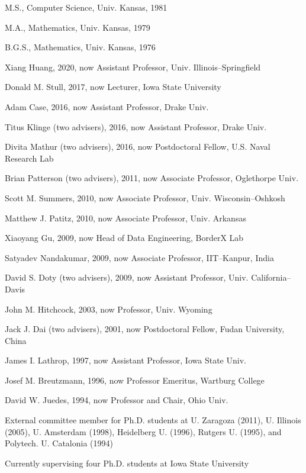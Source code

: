 \documentclass[12pt]{article}
\begin{document}
\indent M.S., Computer Science, Univ. Kansas, 1981

\indent M.A., Mathematics, Univ. Kansas, 1979

\indent B.G.S., Mathematics, Univ. Kansas, 1976


\vspace{0.2cm}


\indent Xiang Huang, 2020, now Assistant Professor, Univ. Illinois--Springfield

\indent Donald M. Stull, 2017, now Lecturer, Iowa State University

\indent Adam Case, 2016, now Assistant Professor, Drake Univ.

\indent Titus Klinge (two advisers), 2016, now Assistant Professor, Drake Univ.

\indent Divita Mathur (two advisers), 2016, now Postdoctoral Fellow, U.S. Naval Research Lab

\indent Brian Patterson (two advisers), 2011, now Associate Professor, Oglethorpe Univ.

\indent Scott M. Summers, 2010, now Associate Professor, Univ. Wisconsin--Oshkosh

\indent Matthew J. Patitz, 2010, now Associate Professor, Univ. Arkansas

\indent Xiaoyang Gu, 2009, now Head of Data Engineering, BorderX Lab

\indent Satyadev Nandakumar, 2009, now Associate Professor, IIT--Kanpur, India

\indent David S. Doty (two advisers), 2009, now Assistant Professor, Univ. California--Davis

\indent John M. Hitchcock, 2003, now Professor, Univ. Wyoming

\indent Jack J. Dai (two advisers), 2001, now Postdoctoral Fellow, Fudan University, China

\indent James I. Lathrop, 1997, now Assistant Professor, Iowa State Univ.

\indent Josef M. Breutzmann, 1996, now Professor Emeritus, Wartburg College

\indent David W. Juedes, 1994, now Professor and Chair, Ohio Univ.

\indent External committee member for Ph.D. students at U. Zaragoza (2011), U. Illinois (2005),
U. Amsterdam (1998), Heidelberg U. (1996), Rutgers U. (1995), and Polytech. U. Catalonia (1994)

\indent Currently supervising four Ph.D. students at Iowa State University
\end{document}
